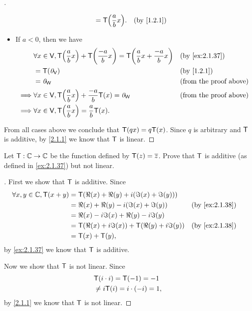 \begin{proof}[]
\begin{itemize}
\begin{align*}
                                                & = \T\pa{\frac{a}{b} x}.               &  & \by{1.2.1}
          \end{align*}
    \item If \(a < 0\), then we have
          \begin{align*}
                     & \forall x \in \V, \T\pa{\frac{a}{b} x} + \T\pa{\frac{-a}{b} x} = \T\pa{\frac{a}{b} x + \frac{-a}{b} x} &  & \by{ex:2.1.37}                \\
                     & = \T(\zv_{\V})                                                                                         &  & \by{1.2.1}                    \\
                     & = \zv_{\W}                                                                                             &  & \text{(from the proof above)} \\
            \implies & \forall x \in \V, \T\pa{\frac{a}{b} x} + \frac{-a}{b} \T(x) = \zv_{\W}                                 &  & \text{(from the proof above)} \\
            \implies & \forall x \in \V, \T\pa{\frac{a}{b} x} = \frac{a}{b} \T(x).
          \end{align*}
  \end{itemize}
  From all cases above we conclude that \(\mathsf{T}(qx) = q \mathsf{T}(x)\).
  Since \(q\) is arbitrary and \(\mathsf{T}\) is additive, by \cref{2.1.1} we know that \(\mathsf{T}\) is linear.
\end{proof}

\begin{ex}\label{ex:2.1.38}
  Let \(\mathsf{T} : \mathbb{C} \to \mathbb{C}\) be the function defined by \(\mathsf{T}(z) = \overline{z}\).
  Prove that \(\mathsf{T}\) is additive (as defined in \cref{ex:2.1.37}) but not linear.
\end{ex}

\begin{proof}[]
  First we show that \(\mathsf{T}\) is additive.
  Since
  \begin{align*}
    \forall x, y \in \C, \T(x + y) & = \T(\Re(x) + \Re(y) + i (\Im(x) + \Im(y)))                         \\
                                   & = \Re(x) + \Re(y) - i (\Im(x) + \Im(y))         &  & \by{ex:2.1.38} \\
                                   & = \Re(x) - i \Im(x) + \Re(y) - i \Im(y)                             \\
                                   & = \T(\Re(x) + i \Im(x)) + \T(\Re(y) + i \Im(y)) &  & \by{ex:2.1.38} \\
                                   & = \T(x) + \T(y),
  \end{align*}
  by \cref{ex:2.1.37} we know that \(\mathsf{T}\) is additive.

  Now we show that \(\mathsf{T}\) is not linear.
  Since
  \begin{align*}
     & \mathsf{T}(i \cdot i) = \mathsf{T}(-1) = -1      \\
     & \neq i \mathsf{T}(i) = i \cdot (-i) = 1,
  \end{align*}
  by \cref{2.1.1} we know that \(\mathsf{T}\) is not linear.
\end{proof}

